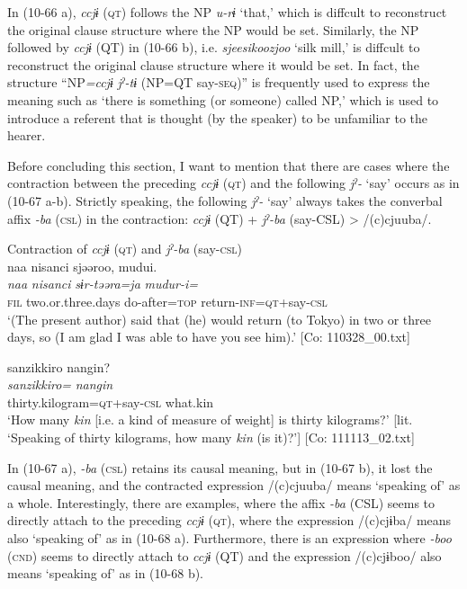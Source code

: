In (10-66 a), \textit{ccjɨ} (\textsc{qt}) follows the NP \textit{u-rɨ} ‘that,’ which is diffcult to reconstruct the original clause structure where the NP would be set. Similarly, the NP followed by \textit{ccjɨ} (QT) in (10-66 b), i.e. \textit{sjeesikoozjoo} ‘silk mill,’ is diffcult to reconstruct the original clause structure where it would be set. In fact, the structure “NP\textit{=ccjɨ} \textit{jˀ-tɨ} (NP=QT say-\textsc{seq})” is frequently used to express the meaning such as ‘there is something (or someone) called NP,’ which is used to introduce a referent that is thought (by the speaker) to be unfamiliar to the hearer.

  Before concluding this section, I want to mention that there are cases where the contraction between the preceding \textit{ccjɨ} (\textsc{qt}) and the following \textit{jˀ-} ‘say’ occurs as in (10-67 a-b). Strictly speaking, the following \textit{jˀ-} ‘say’ always takes the converbal affix \textit{{}-ba} (\textsc{csl}) in the contraction: \textit{ccjɨ} (QT) + \textit{jˀ-ba} (say-CSL) > /(c)cjuuba/.

\ea\label{ex:10.67}   Contraction of \textit{ccjɨ} (\textsc{qt}) and \textit{jˀ-ba} (say-\textsc{csl})\\
  \ea  %
      \glll    naa  {\textbar}nisanci{\textbar}  sjəəroo,  mudui.\\
          \textit{naa}  \textit{nisanci}  \textit{sɨr-təəra=ja}  \textit{mudur-i=}\\
      \textsc{fil}  two.or.three.days  do-after=\textsc{top}  return-\textsc{inf}=\textsc{qt}+say-\textsc{csl}\\
      \glt       ‘(The present author) said that (he) would return (to Tokyo) in two or three days, so (I am glad I was able to have you see him).’ [Co: 110328\_00.txt]

  \ex  %
      \glll    {\textbar}sanzikkiro{\textbar}  {\textbar}nangin{\textbar}?\\
      \textit{sanzikkiro=}  \textit{nangin}\\
      thirty.kilogram=\textsc{qt}+say-\textsc{csl}  what.kin\\
    \glt       ‘How many \textit{kin} [i.e. a kind of measure of weight] is thirty kilograms?’ [lit. ‘Speaking of thirty kilograms, how many \textit{kin} (is it)?’] [Co: 111113\_02.txt]
    \z
\z

In (10-67 a), \textit{{}-ba} (\textsc{csl}) retains its causal meaning, but in (10-67 b), it lost the causal meaning, and the contracted expression /(c)cjuuba/ means ‘speaking of’ as a whole. Interestingly, there are examples, where the affix \textit{{}-ba} (CSL) seems to directly attach to the preceding \textit{ccjɨ} (\textsc{qt}), where the expression /(c)cjɨba/ means also ‘speaking of’ as in (10-68 a). Furthermore, there is an expression where \textit{{}-boo} (\textsc{cnd}) seems to directly attach to \textit{ccjɨ} (QT) and the expression /(c)cjɨboo/ also means ‘speaking of’ as in (10-68 b).


